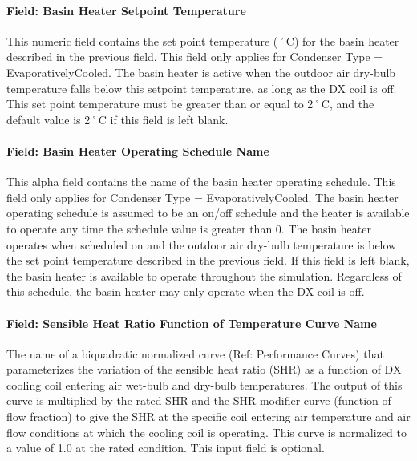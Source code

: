 \paragraph{Field: Basin Heater Setpoint Temperature}\label{field-basin-heater-setpoint-temperature-000}

This numeric field contains the set point temperature (˚C) for the basin heater described in the previous field. This field only applies for Condenser Type = EvaporativelyCooled. The basin heater is active when the outdoor air dry-bulb temperature falls below this setpoint temperature, as long as the DX coil is off. This set point temperature must be greater than or equal to 2˚C, and the default value is 2˚C if this field is left blank.

\paragraph{Field: Basin Heater Operating Schedule Name}\label{field-basin-heater-operating-schedule-name-000}

This alpha field contains the name of the basin heater operating schedule. This field only applies for Condenser Type = EvaporativelyCooled. The basin heater operating schedule is assumed to be an on/off schedule and the heater is available to operate any time the schedule value is greater than 0. The basin heater operates when scheduled on and the outdoor air dry-bulb temperature is below the set point temperature described in the previous field. If this field is left blank, the basin heater is available to operate throughout the simulation. Regardless of this schedule, the basin heater may only operate when the DX coil is off.

\paragraph{Field: Sensible Heat Ratio Function of Temperature Curve Name}\label{field-sensible-heat-ratio-function-of-temperature-curve-name}

The name of a biquadratic normalized curve (Ref: Performance Curves) that parameterizes the variation of the sensible heat ratio (SHR) as a function of DX cooling coil entering air wet-bulb and dry-bulb temperatures. The output of this curve is multiplied by the rated SHR and the SHR modifier curve (function of flow fraction) to give the SHR at the specific coil entering air temperature and air flow conditions at which the cooling coil is operating. This curve is normalized to a value of 1.0 at the rated condition. This input field is optional.

